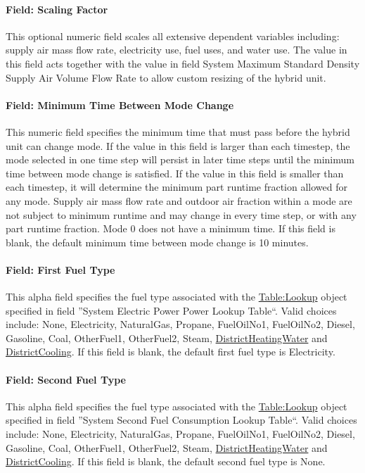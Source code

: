 \paragraph{Field: Scaling Factor}
This optional numeric field scales all extensive dependent variables including: supply air mass flow rate, electricity use, fuel uses, and water use. The value in this field acts together with the value in field System Maximum Standard Density Supply Air Volume Flow Rate to allow custom resizing of the hybrid unit.

\paragraph{Field: Minimum Time Between Mode Change}
This numeric field specifies the minimum time that must pass before the hybrid unit can change mode. If the value in this field is larger than each timestep, the mode selected in one time step will persist in later time steps until the minimum time between mode change is satisfied. If the value in this field is smaller than each timestep, it will determine the minimum part runtime fraction allowed for any mode. Supply air mass flow rate and outdoor air fraction within a mode are not subject to minimum runtime and may change in every time step, or with any part runtime fraction. Mode 0 does not have a minimum time. If this field is blank, the default minimum time between mode change is 10 minutes.

\paragraph{Field: First Fuel Type}
This alpha field specifies the fuel type associated with the \hyperref[tablelookup]{Table:Lookup} object specified in field ''System Electric Power Power Lookup Table``. Valid choices include: None, Electricity, NaturalGas, Propane, FuelOilNo1, FuelOilNo2, Diesel, Gasoline, Coal, OtherFuel1, OtherFuel2, Steam, \hyperref[districtheating]{DistrictHeatingWater} and \hyperref[districtcooling]{DistrictCooling}. If this field is blank, the default first fuel type is Electricity.

\paragraph{Field: Second Fuel Type}
This alpha field specifies the fuel type associated with the \hyperref[tablelookup]{Table:Lookup} object specified in field ''System Second Fuel Consumption Lookup Table``. Valid choices include: None, Electricity, NaturalGas, Propane, FuelOilNo1, FuelOilNo2, Diesel, Gasoline, Coal, OtherFuel1, OtherFuel2, Steam, \hyperref[districtheating]{DistrictHeatingWater} and \hyperref[districtcooling]{DistrictCooling}. If this field is blank, the default second fuel type is None.

